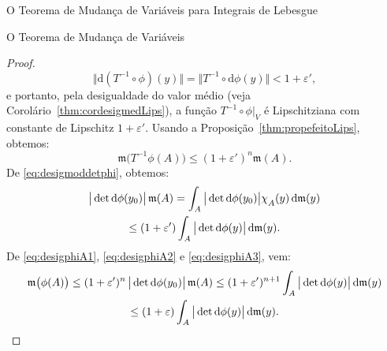 \documentclass[oneside,final,11pt]{amsbook}
\newcommand{\leb}{\mathfrak m}
\newcommand{\dd}{\mathrm d}
\newcommand{\chilow}[1]{\chi_{\lower2pt\hbox{$\scriptstyle#1$}}}
\theoremstyle{remark}\newtheorem{exercise}{Exercício}[chapter]
\theoremstyle{remark}\newtheorem{*exercise}[exercise]{\hbox to 0pt{\hskip 0pt minus 1fil*}Exercício}
\theoremstyle{definition}\newtheorem{exdefin}{Definição}[chapter]
\theoremstyle{plain}\newtheorem{teo}{Teorema}[section]
\theoremstyle{plain}\newtheorem{lem}[teo]{Lema}
\theoremstyle{plain}\newtheorem{prop}[teo]{Proposição}
\theoremstyle{plain}\newtheorem{cor}[teo]{Corolário}
\theoremstyle{definition}\newtheorem{defin}[teo]{Definição}
\theoremstyle{remark}\newtheorem{rem}[teo]{Observação}
\theoremstyle{definition}\newtheorem{notation}[teo]{Notação}
\theoremstyle{definition}\newtheorem{convention}[teo]{Convenção}
\theoremstyle{definition}\newtheorem{example}[teo]{Exemplo}
\numberwithin{section}{chapter}
\numberwithin{equation}{section}
\begin{document}
\begin{chapter}{O Teorema de Mudança de Variáveis para Integrais de Lebesgue}
\begin{section}{O Teorema de Mudança de Variáveis}
\begin{proof}
\[\big\Vert\dd(T^{-1}\circ\phi)(y)\big\Vert=\big\Vert T^{-1}\circ\dd\phi(y)\big\Vert<1+\varepsilon',\]
e portanto, pela desigualdade do valor médio (veja Corolário~\ref{thm:cordesigmedLips}), a função $T^{-1}\circ\phi\vert_V$
é Lipschitziana com constante de Lipschitz $1+\varepsilon'$. Usando a Proposição~\ref{thm:propefeitoLips}, obtemos:
\begin{equation}\label{eq:desigphiA2}
\leb\big(T^{-1}\phi(A)\big)\le(1+\varepsilon')^n\leb(A).
\end{equation}
De \eqref{eq:desigmoddetphi}, obtemos:
\begin{multline}\label{eq:desigphiA3}
\big\vert\det\dd\phi(y_0)\big\vert\,\leb(A)=\int_A\big\vert\det\dd\phi(y_0)\big\vert\chilow{A}(y)\,\dd\leb(y)\\
\le(1+\varepsilon')\int_A\big\vert\det\dd\phi(y)\big\vert\,\dd\leb(y).
\end{multline}
De \eqref{eq:desigphiA1}, \eqref{eq:desigphiA2} e \eqref{eq:desigphiA3}, vem:
\begin{multline*}
\leb\big(\phi(A)\big)\le(1+\varepsilon')^n\,\big\vert\det\dd\phi(y_0)\big\vert\,\leb(A)
\le(1+\varepsilon')^{n+1}\int_A\big\vert\det\dd\phi(y)\big\vert\,\dd\leb(y)\\
\le(1+\varepsilon)\int_A\big\vert\det\dd\phi(y)\big\vert\,\dd\leb(y).\qedhere
\end{multline*}
\end{proof}


\end{section}
\end{chapter}
\end{document}
